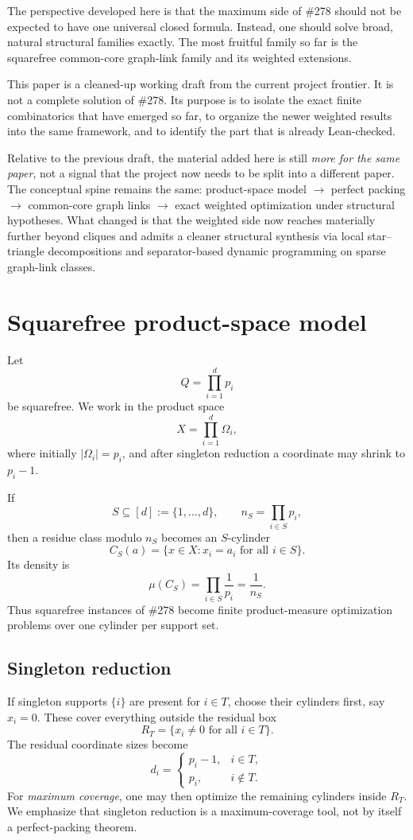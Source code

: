 \documentclass[11pt]{article}
\theoremstyle{definition}
\begin{document}
The perspective developed here is that the maximum side of \#278 should not be expected to have one universal closed formula. Instead, one should solve broad, natural structural families exactly. The most fruitful family so far is the squarefree common-core graph-link family and its weighted extensions.

This paper is a cleaned-up working draft from the current project frontier. It is not a complete solution of \#278. Its purpose is to isolate the exact finite combinatorics that have emerged so far, to organize the newer weighted results into the same framework, and to identify the part that is already Lean-checked.

Relative to the previous draft, the material added here is still \emph{more for the same paper}, not a signal that the project now needs to be split into a different paper. The conceptual spine remains the same: product-space model \(\to\) perfect packing \(\to\) common-core graph links \(\to\) exact weighted optimization under structural hypotheses. What changed is that the weighted side now reaches materially further beyond cliques and admits a cleaner structural synthesis via local star--triangle decompositions and separator-based dynamic programming on sparse graph-link classes.

\section{Squarefree product-space model}
Let
\[
Q=\prod_{i=1}^d p_i
\]
be squarefree. We work in the product space
\[
X=\prod_{i=1}^d \Omega_i,
\]
where initially \(|\Omega_i|=p_i\), and after singleton reduction a coordinate may shrink to \(p_i-1\).

If
\[
S\subseteq [d]:=\{1,\dots,d\},
\qquad
n_S=\prod_{i\in S} p_i,
\]
then a residue class modulo \(n_S\) becomes an \(S\)-cylinder
\[
C_S(a)=\{x\in X: x_i=a_i\text{ for all }i\in S\}.
\]
Its density is
\[
\mu(C_S)=\prod_{i\in S}\frac1{p_i}=\frac1{n_S}.
\]
Thus squarefree instances of \#278 become finite product-measure optimization problems over one cylinder per support set.

\subsection{Singleton reduction}
If singleton supports \(\{i\}\) are present for \(i\in T\), choose their cylinders first, say \(x_i=0\). These cover everything outside the residual box
\[
R_T=\{x_i\neq 0\text{ for all }i\in T\}.
\]
The residual coordinate sizes become
\[
d_i=
\begin{cases}
 p_i-1,& i\in T,\\
 p_i,& i\notin T.
\end{cases}
\]
For \emph{maximum coverage}, one may then optimize the remaining cylinders inside \(R_T\). We emphasize that singleton reduction is a maximum-coverage tool, not by itself a perfect-packing theorem.
\end{document}
